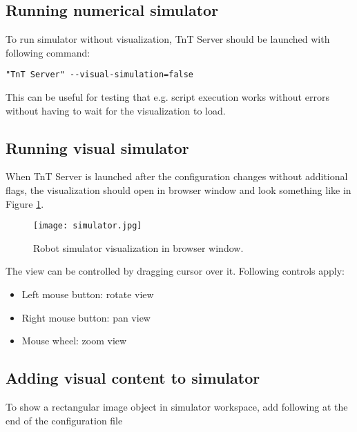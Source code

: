 \subsection{Running numerical simulator}

To run simulator without visualization, TnT Server should be launched with following command:
\begin{lstlisting}
"TnT Server" --visual-simulation=false
\end{lstlisting}

This can be useful for testing that e.g. script execution works without errors without having to wait for the visualization to load.

\subsection{Running visual simulator}

When TnT Server is launched after the configuration changes without additional flags, the visualization should open in browser window and look something like in Figure \ref{fig:simulator}.

\begin{figure}[h]
	\centering
	\texttt{[image: simulator.jpg]}
	\caption{Robot simulator visualization in browser window.}
	\label{fig:simulator}
\end{figure}



The view can be controlled by dragging cursor over it. Following controls apply:

\begin{itemize}
\item Left mouse button: rotate view
\item Right mouse button: pan view
\item Mouse wheel: zoom view
\end{itemize}


\subsection{Adding visual content to simulator}

To show a rectangular image object in simulator workspace, add following at the end of the configuration file

